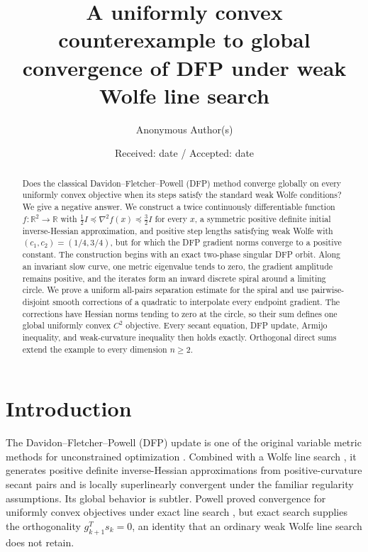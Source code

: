 \documentclass[smallextended,envcountsame]{svjour3}
\title{A uniformly convex counterexample to global convergence of DFP
under weak Wolfe line search}
\author{Anonymous Author(s)}
\institute{Author names, affiliations, corresponding-author email, and ORCID
will be inserted in the final submission file.}
\date{Received: date / Accepted: date}
\newcommand{\R}{\mathbb R}
\begin{document}
\maketitle

\begin{abstract}
Does the classical Davidon--Fletcher--Powell (DFP) method converge globally
on every uniformly convex objective when its steps satisfy the standard weak
Wolfe conditions?  We give a negative answer.  We construct a twice
continuously differentiable function $f:\R^2\to\R$ with
$\frac12 I\preceq\nabla^2 f(x)\preceq\frac32 I$ for every $x$, a symmetric
positive definite initial inverse-Hessian approximation, and positive step
lengths satisfying weak Wolfe with $(c_1,c_2)=(1/4,3/4)$, but for which the
DFP gradient norms converge to a positive constant.  The construction begins
with an exact two-phase singular DFP orbit.  Along an invariant slow curve,
one metric eigenvalue tends to zero, the gradient amplitude remains positive,
and the iterates form an inward discrete spiral around a limiting circle.  We
prove a uniform all-pairs separation estimate for the spiral and use
pairwise-disjoint smooth corrections of a quadratic to interpolate every
endpoint gradient.  The corrections have Hessian norms tending to zero at
the circle, so their sum defines one global uniformly convex $C^2$ objective.
Every secant equation, DFP update, Armijo inequality, and weak-curvature
inequality then holds exactly.  Orthogonal direct sums extend the example to
every dimension $n\ge2$.
\end{abstract}

\section{Introduction}
\label{sec:introduction}

The Davidon--Fletcher--Powell (DFP) update is one of the original variable
metric methods for unconstrained optimization
\cite{Davidon1991,FletcherPowell1963}.  Combined with a Wolfe line search
\cite{Wolfe1969}, it generates positive definite inverse-Hessian
approximations from positive-curvature secant pairs and is locally
superlinearly convergent under the familiar regularity assumptions.  Its
global behavior is subtler.  Powell proved convergence for uniformly convex
objectives under exact line search \cite{Powell1971}, but exact search supplies
the orthogonality $g_{k+1}^{T}s_k=0$, an identity that an ordinary weak Wolfe
line search does not retain.
\end{document}
